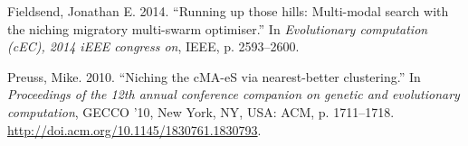 \documentclass[12pt,a4paper]{article}
\begin{document}
\hypertarget{ref-fieldsendux5f2014}{}
Fieldsend, Jonathan E. 2014. ``Running up those hills: Multi-modal
search with the niching migratory multi-swarm optimiser.'' In
\emph{Evolutionary computation (cEC), 2014 iEEE congress on}, IEEE, p.
2593--2600.

\hypertarget{ref-preussux5f2010}{}
Preuss, Mike. 2010. ``Niching the cMA-eS via nearest-better
clustering.'' In \emph{Proceedings of the 12th annual conference
companion on genetic and evolutionary computation}, GECCO '10, New York,
NY, USA: ACM, p. 1711--1718.
\url{http://doi.acm.org/10.1145/1830761.1830793}.
\end{document}
